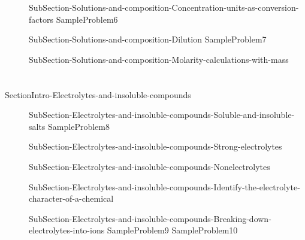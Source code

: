\documentclass[main.tex]{subfiles} %
\newcommand\chapterlabel{Ch-electrolytes}\setcounter{figurenewcounter}{0}\setcounter{tablenewcounter}{0}\setcounter{formulanewcounter}{0}
\begin{document}
\begin{description}
\item[]{SubSection-Solutions-and-composition-Concentration-units-as-conversion-factors}
{SampleProblem6}
\item[]{SubSection-Solutions-and-composition-Dilution}
{SampleProblem7}
\item[]{SubSection-Solutions-and-composition-Molarity-calculations-with-mass}

\end{description}










\section{\color{blue!30!black}{Electrolytes and insoluble compounds}}
{SectionIntro-Electrolytes-and-insoluble-compounds}
\sloppy \begin{description}
\item[] {SubSection-Electrolytes-and-insoluble-compounds-Soluble-and-insoluble-salts}
{SampleProblem8}
\vspace{0cm}{Table-Solubility}
\item[]{SubSection-Electrolytes-and-insoluble-compounds-Strong-electrolytes}
\item[]{SubSection-Electrolytes-and-insoluble-compounds-Nonelectrolytes}

\item[]{SubSection-Electrolytes-and-insoluble-compounds-Identify-the-electrolyte-character-of-a-chemical}
 \vspace{1cm}{Table-Electrolytes	}	

\item[]{SubSection-Electrolytes-and-insoluble-compounds-Breaking-down-electrolytes-into-ions}
{SampleProblem9}
{SampleProblem10}
\end{description}
\end{document}
